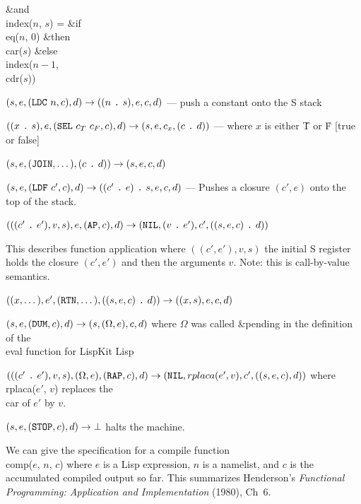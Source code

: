 \&{and} \\{index}($n$, $s$) = \&{if} \\{eq}($n$, $0$) \&{then} \\{car}($s$) %
\&{else}
\\{index}($n-1$, \\{cdr}($s$))

\bull
$(s,e,({\tt LDC}~n,c),d)\to((n~\hbox{\tt .\spacefactor1000}~s),e,c,d)$
--- push a constant onto the S stack

\bull
$((x~\hbox{\tt .\spacefactor1000}~s),e,({\tt SEL}~c_{T}~c_{F}, c), d)%
\to(s,e,c_{x},(c~\hbox{\tt .\spacefactor1000}~d))$
--- where $x$ is either \.{T} or \.{F} [true or false]

\bull
$(s,e,({\tt JOIN},\dots),(c~\hbox{\tt .\spacefactor1000}~d))\to(s,e,c,d)$

\bull
$(s,e,({\tt LDF}~c',c),d)\to((c'~\hbox{\tt .\spacefactor1000}~e)~\hbox{\tt .%
\spacefactor1000}~s,e,c,d)$
--- Pushes a closure $(c',e)$ onto the top of the stack.

\bull
$(((c'~\hbox{\tt .\spacefactor1000}~e'), v, s),e,({\tt AP}, c),d)\to({\tt
NIL},(v~\hbox{\tt .\spacefactor1000}~e'),c',((s,e,c)~\hbox{\tt .%
\spacefactor1000}~d))$

\noindent%
This describes function application where $((c',e'),v,s)$ the initial
S register holds the closure $(c',e')$ and then the arguments
$v$. Note: this is call-by-value semantics.

\bull $((x,\dots),e',({\tt RTN},\dots),((s,e,c)~\hbox{\tt .%
\spacefactor1000}~d))\to((x,s),e,c,d)$

\bull $(s,e,({\tt DUM},c),d)\to(s,(\Omega,e),c,d)$
where $\Omega$ was called \&{pending} in the definition of
the \\{eval} function for LispKit Lisp

\bull $(((c'~\hbox{\tt .\spacefactor1000}~e'),v,s),(\Omega,e),({\tt RAP},c),d)%
\to({\tt NIL}, \\{rplaca}(e',v),c',((s,e,c),d))$
where \\{rplaca}($e'$, $v$) replaces the \\{car} of $e'$ by $v$.

\bull $(s,e,({\tt STOP},c),d)\to\bot$ halts the machine.

\fi

\enspace\ignorespaces%
We can give the specification for a compile function \\{comp}($e$, $n$, $c$)
where $e$ is a Lisp expression, $n$ is a namelist, and $c$ is the
accumulated compiled output so far. This summarizes Henderson's
{\sl Functional Programming: Application and Implementation} (1980), Ch~6.

